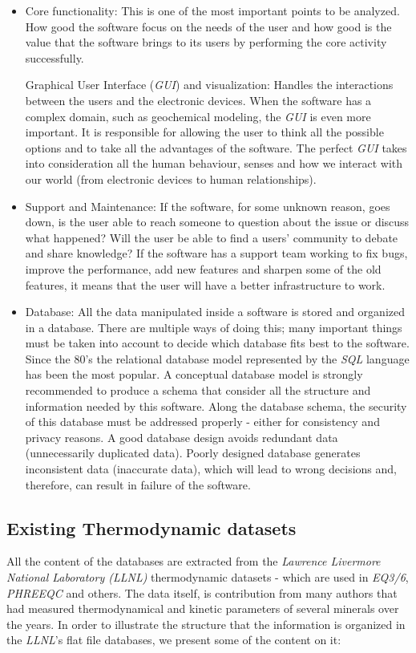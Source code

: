 \documentclass[ppgc,mestrado,english]{iiufrgs}
\begin{document}
\begin{itemize}
\item Core functionality: This is one of the most important points to be analyzed. How good the software focus on the needs of the user and how good is the value that the software brings to its users by performing the core activity successfully.

Graphical User Interface (\emph{GUI}) and visualization: Handles the interactions between the users and the electronic devices. When the software has a complex domain, such as geochemical modeling, the \emph{GUI} is even more important. It is responsible for allowing the user to think all the possible options and to take all the advantages of the software. The perfect \emph{GUI} takes into consideration all the human behaviour, senses and how we interact with our world (from electronic devices to human relationships).

\item Support and Maintenance: If the software, for some unknown reason, goes down, is the user able to reach someone to question about the issue or discuss what happened? Will the user be able to find a users' community to debate and share knowledge? If the software has a support team working to fix bugs, improve the performance, add new features and sharpen some of the old features, it means that the user will have a better infrastructure to work.

\item Database: All the data manipulated inside a software is stored and organized in a database. There are multiple ways of doing this; many important things must be taken into account to decide which database fits best to the software. Since the 80's the relational database model represented by the \emph{SQL} language has been the most popular. A conceptual database model is strongly recommended to produce a schema that consider all the structure and information needed by this software. Along the database schema, the security of this database must be addressed properly - either for consistency and privacy reasons. A good database design avoids redundant data (unnecessarily duplicated data). Poorly designed database generates inconsistent data (inaccurate data), which will lead to wrong decisions and, therefore, can result in failure of the software.
\end{itemize}


\subsection{Existing Thermodynamic datasets}
All the content of the databases are extracted from the \emph{Lawrence Livermore National Laboratory (LLNL)} thermodynamic datasets - which are used in \emph{EQ3/6}, \emph{PHREEQC} and others. The data itself, is contribution from many authors that had measured thermodynamical and kinetic parameters of several minerals over the years. In order to illustrate the structure that the information is organized in the \emph{LLNL}'s flat file databases, we present some of the content on it:
\end{document}
